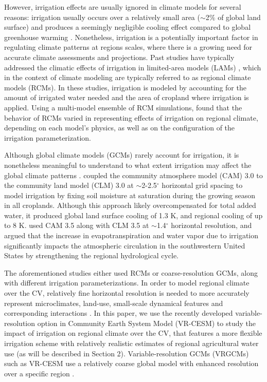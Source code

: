 \documentclass[draft,ms]{agutex}   %
\begin{document}
\begin{article}
However, irrigation effects are usually ignored in climate models for several reasons: irrigation usually occurs over a relatively small area ($\sim$2$\%$ of global land surface) and produces a seemingly negligible cooling effect compared to global greenhouse warming \citep{boucher2004direct}. Nonetheless, irrigation is a potentially important factor in regulating climate patterns at regions scales, where there is a growing need for accurate climate assessments and projections. Past studies have typically addressed the climatic effects of irrigation in limited-area models (LAMs) \citep{snyder2006regional, kueppers2007irrigation}, which in the context of climate modeling are typically referred to as regional climate models (RCMs). In these studies, irrigation is modeled by accounting for the amount of irrigated water needed and the area of cropland where irrigation is applied. Using a multi-model ensemble of RCM simulations, \cite{kueppers2008seasonal} found that the behavior of RCMs varied in representing effects of irrigation on regional climate, depending on each model's physics, as well as on the configuration of the irrigation parameterization.

Although global climate models (GCMs) rarely account for irrigation, it is nonetheless meaningful to understand to what extent irrigation may affect the global climate patterns \citep{sacks2009effects}. \citet{lobell2006biogeophysical} coupled the community atmosphere model (CAM) 3.0 to the community land model (CLM) 3.0 at $\sim$2-2.5$^\circ$ horizontal grid spacing to model irrigation by fixing soil moisture at saturation during the growing season in all croplands. Although this approach likely overcompensated for total added water, it produced global land surface cooling of 1.3 K, and regional cooling of up to 8 K. \citet{lo2013irrigation} used CAM 3.5 along with CLM 3.5 at $\sim$1.4$^\circ$ horizontal resolution, and argued that the increase in evapotranspiration and water vapor due to irrigation significantly impacts the atmospheric circulation in the southwestern United States by strengthening the regional hydrological cycle.

The aforementioned studies either used RCMs or coarse-resolution GCMs, along with different irrigation parameterizations. In order to model regional climate over the CV, relatively fine horizontal resolution is needed to more accurately represent microclimates, land-use, small-scale dynamical features and corresponding interactions \citep{leung2003regional, rauscher2010resolution}. In this paper, we use the recently developed variable-resolution option in Community Earth System Model (VR-CESM) to study the impact of irrigation on regional climate over the CV, that features a more flexible irrigation scheme with relatively realistic estimates of regional agricultural water use (as will be described in Section 2). Variable-resolution GCMs (VRGCMs) such as VR-CESM use a relatively coarse global model with enhanced resolution over a specific region \citep{staniforth1978variable, fox1997finite}. 



\end{article}
\end{document}
